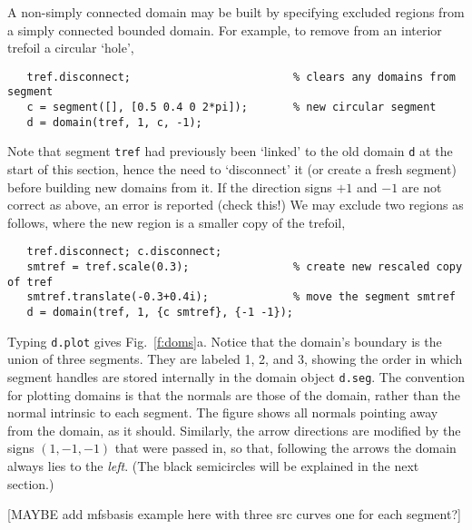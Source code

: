 A non-simply connected domain may be built by specifying excluded
regions from a simply connected bounded domain. For example,
to remove from an interior trefoil a circular `hole',
\begin{verbatim}
   tref.disconnect;                         % clears any domains from segment
   c = segment([], [0.5 0.4 0 2*pi]);       % new circular segment
   d = domain(tref, 1, c, -1);
\end{verbatim}
Note that segment {\tt tref} had previously
been `linked' to the old domain {\tt d}
at the start of this section, hence the need to `disconnect' it
(or create a fresh segment) before
building new domains from it. 
If the direction signs $+1$ and $-1$ are not correct as above, an
error is reported (check this!)
We may exclude two regions as follows, where the new region is a smaller copy
of the trefoil,
\begin{verbatim}
   tref.disconnect; c.disconnect;
   smtref = tref.scale(0.3);                % create new rescaled copy of tref
   smtref.translate(-0.3+0.4i);             % move the segment smtref
   d = domain(tref, 1, {c smtref}, {-1 -1});
\end{verbatim}
Typing {\tt d.plot} gives Fig.~\ref{f:doms}a. Notice that
the domain's boundary is the union of three segments. They are labeled
1, 2, and 3, showing the order in which segment handles
are stored internally in the domain object {\tt d.seg}.
The convention for plotting domains is that the normals
are those of the domain, rather than the normal intrinsic to each segment.
The figure shows all normals pointing away from the domain, as it should.
Similarly, the arrow directions are modified by the signs $(1,-1,-1)$ that
were passed in, so that, following the arrows the domain always lies to
the {\em left}. (The black semicircles will be explained in the next section.)


[MAYBE add mfsbasis example here with three src curves one for each segment?]

\vspace{10ex}


